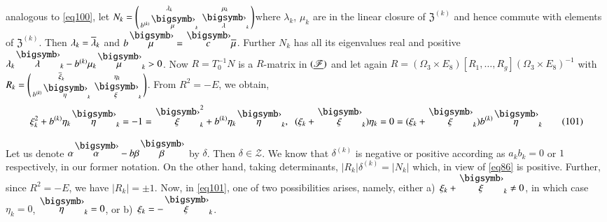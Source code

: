 analogous to \eqref{eq100}, let $N_{k}=\left(\begin{smallmatrix}
  \lambda_{k} & \mu_{k}\\ b^{(k)}\overdot{\mu}_{k} &
  \overdot{\lambda}_{k}\end{smallmatrix}\right)$\pageoriginale where
$\lambda_{k}$, 
$\mu_{k}$ are in the linear closure of $\mathfrak{Z}^{(k)}$ and hence
commute with elements of $\mathfrak{Z}^{(k)}$. Then
$\lambda_{k}=\overline{\lambda}_{k}$ and
$b\overdot{\mu}=\overdot{c}\ob{\mu}$. Further $N_{k}$ has all its
eigenvalues real and positive \ie
$\lambda_{k}\overdot{\lambda}_{k}-b^{(k)}\mu_{k}\overdot{\mu}_{k}>0$. Now
$R=T^{-1}_{0}N$ is a $R$-matrix in $(\underline{\mathscr{F}})$ and let again
$R=(\Omega_{3}\times E_{8})[R_{1},\ldots,R_{g}](\Omega_{3}\times
E_{8})^{-1}$ with $R_{k}=\left(\begin{smallmatrix}\ob{\xi}_{k} &
  \eta_{k}\\ b^{(k)}\overdot{\eta}_{k} & \overdot{\xi}_{k}
\end{smallmatrix}\right)$. From $R^{2}=-E$, we obtain,
\begin{equation*}
\xi^{2}_{k}+b^{(k)}\eta_{k}\overdot{\eta}_{k}=-1=
\overdot{\xi}^{2}_{k}+b^{(k)}\eta_{k}\overdot{\eta}_{k},
\;\; 
(\xi_{k}+\overdot{\xi}_{k})\eta_{k}=0=(\xi_{k}+
\overdot{\xi}_{k})b^{(k)}\overdot{\eta}_{k}\tag{101}\label{eq101} 
\end{equation*}

Let us denote $\alpha\overdot{\alpha}-b\beta\overdot{\beta}$ by
$\delta$. Then $\delta\in\mathscr{Z}$. We know that $\delta^{(k)}$ is
negative or positive according as $a_{k}b_{k}=0$ or $1$ respectively,
in our former notation. On the other hand, taking determinants,
$|R_{k}|\delta^{(k)}=|N_{k}|$ which, in view of \eqref{eq86} is
positive. Further, since $R^{2}=-E$, we have $|R_{k}|=\pm 1$. Now, in
\eqref{eq101}, one of two possibilities arises, namely, either
a)~$\xi_{k}+\overdot{\xi}_{k}\neq 0$, in which case $\eta_{k}=0$,
$\overdot{\eta}_{k}=0$, or b)~$\xi_{k}=-\overdot{\xi}_{k}$.

